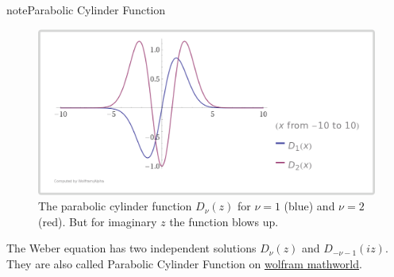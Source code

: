 \documentclass[letterpaper,12pt,english]{sphinxmanual}
\begin{document}
\begin{notice}{note}{Parabolic Cylinder Function}
\begin{figure}[htbp]
\centering
\capstart

\includegraphics{weber1.png}
\caption{The parabolic cylinder function \(D_\nu(z)\) for \(\nu=1\) (blue) and \(\nu=2\) (red). But for imaginary \(z\) the function blows up.}\end{figure}

The Weber equation has two independent solutions \(D_\nu(z)\) and \(D_{-\nu-1}(iz)\). They are also called Parabolic Cylinder Function on \href{http://mathworld.wolfram.com/ParabolicCylinderFunction.html}{wolfram mathworld}.


\end{notice}
\end{document}
